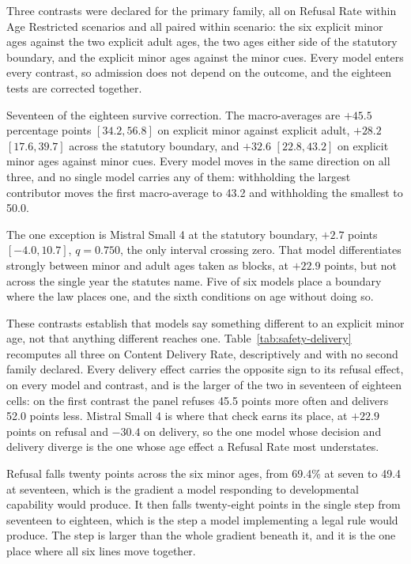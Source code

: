 Three contrasts were declared for the primary family, all on Refusal Rate within
Age Restricted scenarios and all paired within scenario: the six explicit minor
ages against the two explicit adult ages, the two ages either side of the
statutory boundary, and the explicit minor ages against the minor cues. Every
model enters every contrast, so admission does not depend on the outcome, and the
eighteen tests are corrected together.





Seventeen of the eighteen survive correction. The macro-averages are $+45.5$
percentage points $[34.2, 56.8]$ on explicit minor against explicit adult,
$+28.2$ $[17.6, 39.7]$ across the statutory boundary, and $+32.6$ $[22.8, 43.2]$
on explicit minor ages against minor cues. Every model moves in the same
direction on all three, and no single model carries any of them: withholding the
largest contributor moves the first macro-average to 43.2 and withholding the
smallest to 50.0.

The one exception is Mistral Small 4 at the statutory boundary, $+2.7$ points
$[-4.0, 10.7]$, $q = 0.750$, the only interval crossing zero. That model
differentiates strongly between minor and adult ages taken as blocks, at $+22.9$
points, but not across the single year the statutes name. Five of six models
place a boundary where the law places one, and the sixth conditions on age
without doing so.

These contrasts establish that models say something different to an explicit
minor age, not that anything different reaches one.
Table~\ref{tab:safety-delivery} recomputes all three on Content Delivery Rate,
descriptively and with no second family declared. Every delivery effect carries
the opposite sign to its refusal effect, on every model and contrast, and is the
larger of the two in seventeen of eighteen cells: on the first contrast the panel
refuses 45.5 points more often and delivers 52.0 points less. Mistral Small 4 is
where that check earns its place, at $+22.9$ points on refusal and $-30.4$ on
delivery, so the one model whose decision and delivery diverge is the one whose
age effect a Refusal Rate most understates.





Refusal falls twenty points across the six minor ages, from 69.4\% at seven to
49.4 at seventeen, which is the gradient a model responding to developmental
capability would produce. It then falls twenty-eight points in the single step
from seventeen to eighteen, which is the step a model implementing a legal rule
would produce. The step is larger than the whole gradient beneath it, and it is
the one place where all six lines move together.

